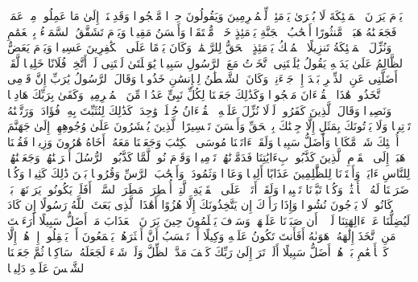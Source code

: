 \stopbuffer%
\startbuffer[\q:25:22]
یَوۡمَ یَرَوۡنَ ٱلۡمَلَٰۤئِكَةَ لَا بُشۡرَىٰ یَوۡمَئِذࣲ لِّلۡمُجۡرِمِینَ وَیَقُولُونَ حِجۡرࣰا مَّحۡجُورࣰا%
\stopbuffer%
\startbuffer[\q:25:23]
وَقَدِمۡنَاۤ إِلَىٰ مَا عَمِلُوا۟ مِنۡ عَمَلࣲ فَجَعَلۡنَٰهُ هَبَاۤءࣰ مَّنثُورًا%
\stopbuffer%
\startbuffer[\q:25:24]
أَصۡحَٰبُ ٱلۡجَنَّةِ یَوۡمَئِذٍ خَیۡرࣱ مُّسۡتَقَرࣰّا وَأَحۡسَنُ مَقِیلࣰا%
\stopbuffer%
\startbuffer[\q:25:25]
وَیَوۡمَ تَشَقَّقُ ٱلسَّمَاۤءُ بِٱلۡغَمَٰمِ وَنُزِّلَ ٱلۡمَلَٰۤئِكَةُ تَنزِیلًا%
\stopbuffer%
\startbuffer[\q:25:26]
ٱلۡمُلۡكُ یَوۡمَئِذٍ ٱلۡحَقُّ لِلرَّحۡمَٰنِۚ وَكَانَ یَوۡمًا عَلَى ٱلۡكَٰفِرِینَ عَسِیرࣰا%
\stopbuffer%
\startbuffer[\q:25:27]
وَیَوۡمَ یَعَضُّ ٱلظَّالِمُ عَلَىٰ یَدَیۡهِ یَقُولُ یَٰلَیۡتَنِی ٱتَّخَذۡتُ مَعَ ٱلرَّسُولِ سَبِیلࣰا%
\stopbuffer%
\startbuffer[\q:25:28]
یَٰوَیۡلَتَىٰ لَیۡتَنِی لَمۡ أَتَّخِذۡ فُلَانًا خَلِیلࣰا%
\stopbuffer%
\startbuffer[\q:25:29]
لَّقَدۡ أَضَلَّنِی عَنِ ٱلذِّكۡرِ بَعۡدَ إِذۡ جَاۤءَنِیۗ وَكَانَ ٱلشَّیۡطَٰنُ لِلۡإِنسَٰنِ خَذُولࣰا%
\stopbuffer%
\startbuffer[\q:25:30]
وَقَالَ ٱلرَّسُولُ یَٰرَبِّ إِنَّ قَوۡمِی ٱتَّخَذُوا۟ هَٰذَا ٱلۡقُرۡءَانَ مَهۡجُورࣰا%
\stopbuffer%
\startbuffer[\q:25:31]
وَكَذَٰلِكَ جَعَلۡنَا لِكُلِّ نَبِیٍّ عَدُوࣰّا مِّنَ ٱلۡمُجۡرِمِینَۗ وَكَفَىٰ بِرَبِّكَ هَادِیࣰا وَنَصِیرࣰا%
\stopbuffer%
\startbuffer[\q:25:32]
وَقَالَ ٱلَّذِینَ كَفَرُوا۟ لَوۡلَا نُزِّلَ عَلَیۡهِ ٱلۡقُرۡءَانُ جُمۡلَةࣰ وَٰحِدَةࣰۚ كَذَٰلِكَ لِنُثَبِّتَ بِهِۦ فُؤَادَكَۖ وَرَتَّلۡنَٰهُ تَرۡتِیلࣰا%
\stopbuffer%
\startbuffer[\q:25:33]
وَلَا یَأۡتُونَكَ بِمَثَلٍ إِلَّا جِئۡنَٰكَ بِٱلۡحَقِّ وَأَحۡسَنَ تَفۡسِیرًا%
\stopbuffer%
\startbuffer[\q:25:34]
ٱلَّذِینَ یُحۡشَرُونَ عَلَىٰ وُجُوهِهِمۡ إِلَىٰ جَهَنَّمَ أُو۟لَٰۤئِكَ شَرࣱّ مَّكَانࣰا وَأَضَلُّ سَبِیلࣰا%
\stopbuffer%
\startbuffer[\q:25:35]
وَلَقَدۡ ءَاتَیۡنَا مُوسَى ٱلۡكِتَٰبَ وَجَعَلۡنَا مَعَهُۥۤ أَخَاهُ هَٰرُونَ وَزِیرࣰا%
\stopbuffer%
\startbuffer[\q:25:36]
فَقُلۡنَا ٱذۡهَبَاۤ إِلَى ٱلۡقَوۡمِ ٱلَّذِینَ كَذَّبُوا۟ بِءَایَٰتِنَا فَدَمَّرۡنَٰهُمۡ تَدۡمِیرࣰا%
\stopbuffer%
\startbuffer[\q:25:37]
وَقَوۡمَ نُوحࣲ لَّمَّا كَذَّبُوا۟ ٱلرُّسُلَ أَغۡرَقۡنَٰهُمۡ وَجَعَلۡنَٰهُمۡ لِلنَّاسِ ءَایَةࣰۖ وَأَعۡتَدۡنَا لِلظَّٰلِمِینَ عَذَابًا أَلِیمࣰا%
\stopbuffer%
\startbuffer[\q:25:38]
وَعَادࣰا وَثَمُودَا۟ وَأَصۡحَٰبَ ٱلرَّسِّ وَقُرُونَۢا بَیۡنَ ذَٰلِكَ كَثِیرࣰا%
\stopbuffer%
\startbuffer[\q:25:39]
وَكُلࣰّا ضَرَبۡنَا لَهُ ٱلۡأَمۡثَٰلَۖ وَكُلࣰّا تَبَّرۡنَا تَتۡبِیرࣰا%
\stopbuffer%
\startbuffer[\q:25:40]
وَلَقَدۡ أَتَوۡا۟ عَلَى ٱلۡقَرۡیَةِ ٱلَّتِیۤ أُمۡطِرَتۡ مَطَرَ ٱلسَّوۡءِۚ أَفَلَمۡ یَكُونُوا۟ یَرَوۡنَهَاۚ بَلۡ كَانُوا۟ لَا یَرۡجُونَ نُشُورࣰا%
\stopbuffer%
\startbuffer[\q:25:41]
وَإِذَا رَأَوۡكَ إِن یَتَّخِذُونَكَ إِلَّا هُزُوًا أَهَٰذَا ٱلَّذِی بَعَثَ ٱللَّهُ رَسُولًا%
\stopbuffer%
\startbuffer[\q:25:42]
إِن كَادَ لَیُضِلُّنَا عَنۡ ءَالِهَتِنَا لَوۡلَاۤ أَن صَبَرۡنَا عَلَیۡهَاۚ وَسَوۡفَ یَعۡلَمُونَ حِینَ یَرَوۡنَ ٱلۡعَذَابَ مَنۡ أَضَلُّ سَبِیلًا%
\stopbuffer%
\startbuffer[\q:25:43]
أَرَءَیۡتَ مَنِ ٱتَّخَذَ إِلَٰهَهُۥ هَوَىٰهُ أَفَأَنتَ تَكُونُ عَلَیۡهِ وَكِیلًا%
\stopbuffer%
\startbuffer[\q:25:44]
أَمۡ تَحۡسَبُ أَنَّ أَكۡثَرَهُمۡ یَسۡمَعُونَ أَوۡ یَعۡقِلُونَۚ إِنۡ هُمۡ إِلَّا كَٱلۡأَنۡعَٰمِ بَلۡ هُمۡ أَضَلُّ سَبِیلًا%
\stopbuffer%
\startbuffer[\q:25:45]
أَلَمۡ تَرَ إِلَىٰ رَبِّكَ كَیۡفَ مَدَّ ٱلظِّلَّ وَلَوۡ شَاۤءَ لَجَعَلَهُۥ سَاكِنࣰا ثُمَّ جَعَلۡنَا ٱلشَّمۡسَ عَلَیۡهِ دَلِیلࣰا%
\stopbuffer%
